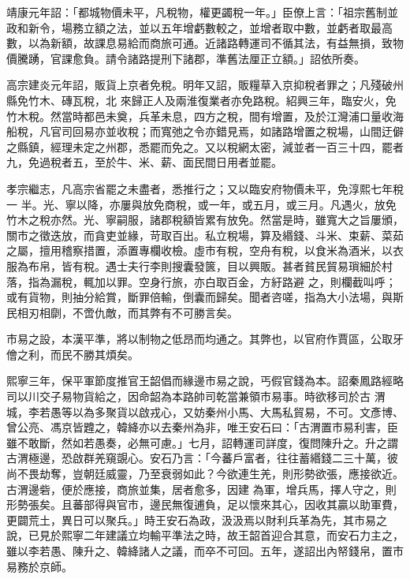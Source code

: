 \begin{pinyinscope}
 靖康元年詔：「都城物價未平，凡稅物，權更蠲稅一年。」臣僚上言：「祖宗舊制並政和新令，場務立額之法，並以五年增虧數較之，並增者取中數，並虧者取最高數，以為新額，故課息易給而商旅可通。近諸路轉運司不循其法，有益無損，致物價騰踴，官課愈負。請令諸路提刑下諸郡，準舊法厘正立額。」詔依所奏。



 高宗建炎元年詔，販貨上京者免稅。明年又詔，販糧草入京抑稅者罪之；凡殘破州縣免竹木、磚瓦稅，北
 來歸正人及兩淮復業者亦免路稅。紹興三年，臨安火，免竹木稅。然當時都邑未奠，兵革未息，四方之稅，間有增置，及於江灣浦口量收海船稅，凡官司回易亦並收稅；而寬弛之令亦錯見焉，如諸路增置之稅場，山間迂僻之縣鎮，經理未定之州郡，悉罷而免之。又以稅網太密，減並者一百三十四，罷者九，免過稅者五，至於牛、米、薪、面民間日用者並罷。



 孝宗繼志，凡高宗省罷之未盡者，悉推行之；又以臨安府物價未平，免淳熙七年稅一
 半。光、寧以降，亦屢與放免商稅，或一年，或五月，或三月。凡遇火，放免竹木之稅亦然。光、寧嗣服，諸郡稅額皆累有放免。然當是時，雖寬大之旨屢頒，關市之徵迭放，而貪吏並緣，苛取百出。私立稅場，算及緡錢、斗米、束薪、菜茹之屬，擅用稽察措置，添置專欄收檢。虛市有稅，空舟有稅，以食米為酒米，以衣服為布帛，皆有稅。遇士夫行李則搜囊發篋，目以興販。甚者貧民貿易瑣細於村落，指為漏稅，輒加以罪。空身行旅，亦白取百金，方紆路避
 之，則欄截叫呼；或有貨物，則抽分給賞，斷罪倍輸，倒囊而歸矣。聞者咨嗟，指為大小法場，與斯民相刃相劘，不啻仇敵，而其弊有不可勝言矣。



 市易之設，本漢平準，將以制物之低昂而均通之。其弊也，以官府作賈區，公取牙儈之利，而民不勝其煩矣。



 熙寧三年，保平軍節度推官王韶倡而緣邊市易之說，丐假官錢為本。詔秦鳳路經略司以川交子易物貨給之，因命韶為本路帥司乾當兼領市易事。時欲移司於古
 渭城，李若愚等以為多聚貨以啟戎心，又妨秦州小馬、大馬私貿易，不可。文彥博、曾公亮、馮京皆韙之，韓絳亦以去秦州為非，唯王安石曰：「古渭置市易利害，臣雖不敢斷，然如若愚奏，必無可慮。」七月，詔轉運司詳度，復問陳升之。升之謂古渭極邊，恐啟群羌窺覬心。安石乃言：「今蕃戶富者，往往蓄緡錢二三十萬，彼尚不畏劫奪，豈朝廷威靈，乃至衰弱如此？今欲連生羌，則形勢欲張，應接欲近。古渭邊砦，便於應接，商旅並集，居者愈多，因建
 為軍，增兵馬，擇人守之，則形勢張矣。且蕃部得與官市，邊民無復逋負，足以懷來其心，因收其贏以助軍費，更闢荒土，異日可以聚兵。」時王安石為政，汲汲焉以財利兵革為先，其市易之說，已見於熙寧二年建議立均輸平準法之時，故王韶首迎合其意，而安石力主之，雖以李若愚、陳升之、韓絳諸人之議，而卒不可回。五年，遂詔出內帑錢帛，置市易務於京師。




\end{pinyinscope}
